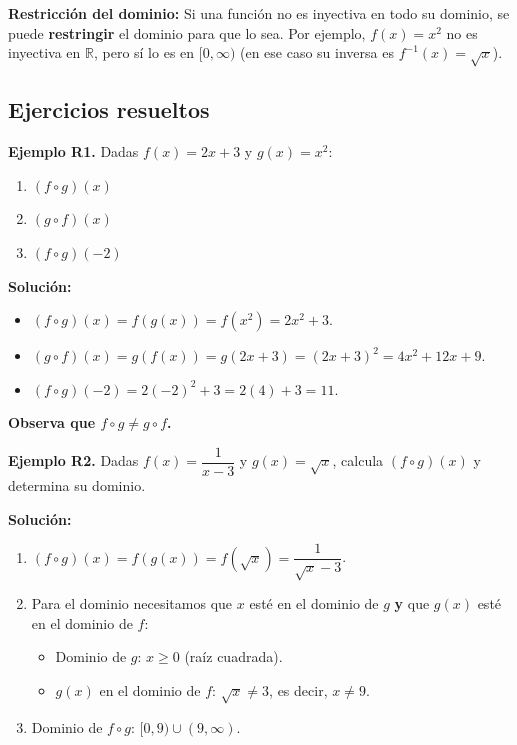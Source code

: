 \documentclass[12pt, letterpaper]{article}
\begin{document}
\begin{cuadroadvertencia}
  \textbf{Restricción del dominio:} Si una función no es inyectiva en todo su dominio, se puede \textbf{restringir} el dominio para que lo sea. Por ejemplo, $f(x) = x^2$ no es inyectiva en $\mathbb{R}$, pero sí lo es en $[0, \infty)$ (en ese caso su inversa es $f^{-1}(x) = \sqrt{x}$).
\end{cuadroadvertencia}

\subsection{Ejercicios resueltos}

\textbf{Ejemplo R1.} Dadas $f(x) = 2x + 3$ y $g(x) = x^2$:
\begin{enumerate}[label=\alph*)]
  \item $(f \circ g)(x)$
  \item $(g \circ f)(x)$
  \item $(f \circ g)(-2)$
\end{enumerate}

\begin{cuadrosolucion}
  \textbf{Solución:}
  \begin{itemize}
    \item $(f \circ g)(x) = f(g(x)) = f(x^2) = 2x^2 + 3$.
    \item $(g \circ f)(x) = g(f(x)) = g(2x + 3) = (2x + 3)^2 = 4x^2 + 12x + 9$.
    \item $(f \circ g)(-2) = 2(-2)^2 + 3 = 2(4) + 3 = 11$.
  \end{itemize}
  \textbf{Observa que $f \circ g \neq g \circ f$.}
\end{cuadrosolucion}

\newpage

\textbf{Ejemplo R2.} Dadas $f(x) = \dfrac{1}{x - 3}$ y $g(x) = \sqrt{x}$, calcula $(f \circ g)(x)$ y determina su dominio.

\begin{cuadrosolucion}
  \textbf{Solución:}
  \begin{enumerate}
    \item $(f \circ g)(x) = f(g(x)) = f(\sqrt{x}) = \dfrac{1}{\sqrt{x} - 3}$.
    \item Para el dominio necesitamos que $x$ esté en el dominio de $g$ \textbf{y} que $g(x)$ esté en el dominio de $f$:
          \begin{itemize}
            \item Dominio de $g$: $x \geq 0$ (raíz cuadrada).
            \item $g(x)$ en el dominio de $f$: $\sqrt{x} \neq 3$, es decir, $x \neq 9$.
          \end{itemize}
    \item Dominio de $f \circ g$: $[0, 9) \cup (9, \infty)$.
  \end{enumerate}
\end{cuadrosolucion}
\end{document}

